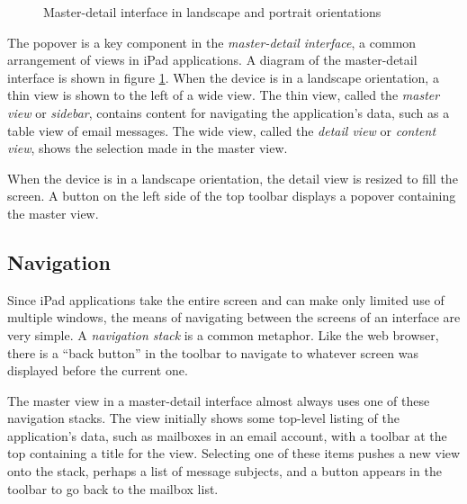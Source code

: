 \begin{figure}
    \caption{\label{fig:master_detail} Master-detail interface in landscape
    and portrait orientations}
\end{figure}

The popover is a key component in the \emph{master-detail interface}, a common
arrangement of views in iPad applications. A diagram of the master-detail
interface is shown in figure \ref{fig:master_detail}. When the device is in a
landscape orientation, a thin view is shown to the left of a wide view. The thin
view, called the \emph{master view} or \emph{sidebar}, contains content for
navigating the application's data, such as a table view of email messages. The
wide view, called the \emph{detail view} or \emph{content view}, shows the
selection made in the master view.

When the device is in a landscape orientation, the detail view is resized to
fill the screen. A button on the left side of the top toolbar displays a popover
containing the master view.

\subsection{Navigation}
\label{sect:ipad_navigation}

Since iPad applications take the entire screen and can make only limited use of
multiple windows, the means of navigating between the screens of an interface
are very simple. A \emph{navigation stack} is a common metaphor. Like the web
browser, there is a ``back button'' in the toolbar to navigate to whatever
screen was displayed before the current one.

The master view in a master-detail interface almost always uses one of these
navigation stacks. The view initially shows some top-level listing of the
application's data, such as mailboxes in an email account, with a toolbar at the
top containing a title for the view. Selecting one of these items pushes a new
view onto the stack, perhaps a list of message subjects, and a button appears
in the toolbar to go back to the mailbox list.
